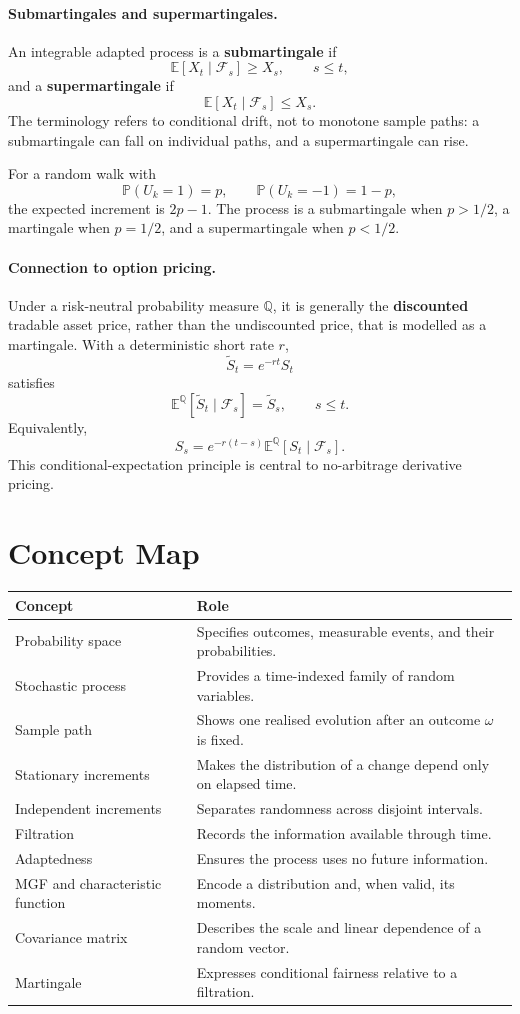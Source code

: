 \documentclass[12pt,openany]{book}
\theoremstyle{definition}
\theoremstyle{remark}
\begin{document}
\paragraph{Submartingales and supermartingales.}
An integrable adapted process is a \textbf{submartingale} if
\[
\mathbb{E}[X_t\mid\mathcal{F}_s]\geq X_s,
\qquad s\leq t,
\]
and a \textbf{supermartingale} if
\[
\mathbb{E}[X_t\mid\mathcal{F}_s]\leq X_s.
\]
The terminology refers to conditional drift, not to monotone sample paths:
a submartingale can fall on individual paths, and a supermartingale can rise.

For a random walk with
\[
\mathbb{P}(U_k=1)=p,
\qquad
\mathbb{P}(U_k=-1)=1-p,
\]
the expected increment is \(2p-1\). The process is a submartingale when
\(p>1/2\), a martingale when \(p=1/2\), and a supermartingale when \(p<1/2\).

\paragraph{Connection to option pricing.}
Under a risk-neutral probability measure \(\mathbb{Q}\), it is generally the
\textbf{discounted} tradable asset price, rather than the undiscounted price,
that is modelled as a martingale. With a deterministic short rate \(r\),
\[
\widetilde{S}_t=e^{-rt}S_t
\]
satisfies
\[
\mathbb{E}^{\mathbb{Q}}
\!\left[\widetilde{S}_t\mid\mathcal{F}_s\right]
=\widetilde{S}_s,
\qquad s\leq t.
\]
Equivalently,
\[
S_s
=e^{-r(t-s)}
\mathbb{E}^{\mathbb{Q}}[S_t\mid\mathcal{F}_s].
\]
This conditional-expectation principle is central to no-arbitrage derivative
pricing.

\section{Concept Map}

\begin{longtable}{@{}L{0.25\textwidth}L{0.65\textwidth}@{}}
\toprule
\textbf{Concept} & \textbf{Role} \\
\midrule
Probability space & Specifies outcomes, measurable events, and their
probabilities. \\
Stochastic process & Provides a time-indexed family of random variables. \\
Sample path & Shows one realised evolution after an outcome \(\omega\) is
fixed. \\
Stationary increments & Makes the distribution of a change depend only on
elapsed time. \\
Independent increments & Separates randomness across disjoint intervals. \\
Filtration & Records the information available through time. \\
Adaptedness & Ensures the process uses no future information. \\
MGF and characteristic function & Encode a distribution and, when valid,
its moments. \\
Covariance matrix & Describes the scale and linear dependence of a random
vector. \\
Martingale & Expresses conditional fairness relative to a filtration. \\
\bottomrule
\end{longtable}
\end{document}
